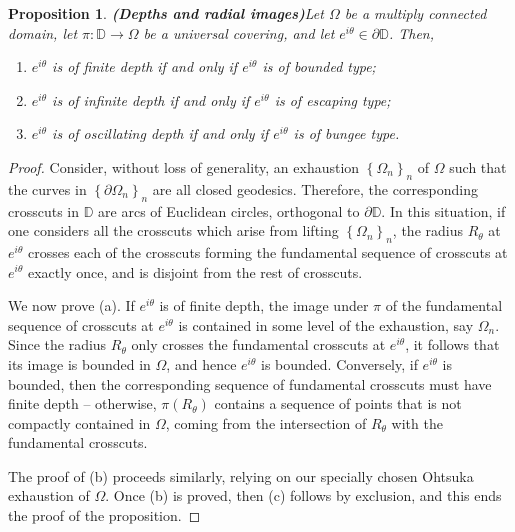 \documentclass[11pt,a4paper,reqno]{amsart}
\theoremstyle{plain}
\newtheorem{prop}[thm]{Proposition}
\theoremstyle{definition}
\theoremstyle{plain}
\begin{document}
\begin{prop}{\bf (Depths and radial images)}\label{prop-bound-esc-bungee2}
	Let $ \Omega $ be a multiply connected domain, let $ \pi\colon\mathbb{D}\to\Omega $ be a universal covering, and let $ e^{i\theta} \in\partial\mathbb{D}$. Then,
		\begin{enumerate}[label={\em (\alph*)}]
		\item $ e^{i\theta} $ is of finite depth if and only if $ e^{i\theta}  $ is of bounded type;
		\item $ e^{i\theta} $ is of infinite depth if and only if $ e^{i\theta} $ is of escaping type;
		\item $ e^{i\theta} $ is of oscillating depth if and only if $ e^{i\theta} $ is of bungee type.
	\end{enumerate}
\end{prop}
\begin{proof}
Consider, without loss of generality,  an exhaustion $ \left\lbrace \Omega_n\right\rbrace _n $ of $ \Omega $ such that the curves in $ \left\lbrace \partial\Omega_n\right\rbrace _n $  are all closed geodesics. Therefore, the corresponding crosscuts in $ \mathbb{D} $ are arcs of Euclidean circles, orthogonal to $ \partial\mathbb{D} $. In this situation, if one considers all the crosscuts which arise from lifting $ \left\lbrace \Omega_n\right\rbrace _n $, the radius $ R_\theta $ at $ e^{i\theta} $ crosses each of the crosscuts forming the fundamental sequence of crosscuts at $ e^{i\theta} $ exactly once, and is disjoint from the rest of crosscuts.

We now prove (a). If $ e^{i\theta} $ is of finite depth, the image under $ \pi $ of the fundamental sequence of crosscuts at $ e^{i\theta} $ is contained in some level of the exhaustion, say $ \Omega_n $. Since the radius $ R_\theta $ only crosses the fundamental crosscuts at $e^{i\theta}$, it follows that its image is bounded in $ \Omega $, and hence $ e^{i\theta} $ is bounded. Conversely, if $ e^{i\theta} $ is bounded, then the corresponding sequence of fundamental crosscuts must have finite depth -- otherwise, $\pi(R_\theta)$ contains a sequence of points that is not compactly contained in $\Omega$, coming from the intersection of $R_\theta$ with the fundamental crosscuts.

The proof of (b) proceeds similarly, relying on our specially chosen Ohtsuka exhaustion of $\Omega$. Once (b) is proved, then (c) follows by exclusion, and this ends the proof of the proposition.
\end{proof}
\end{document}
